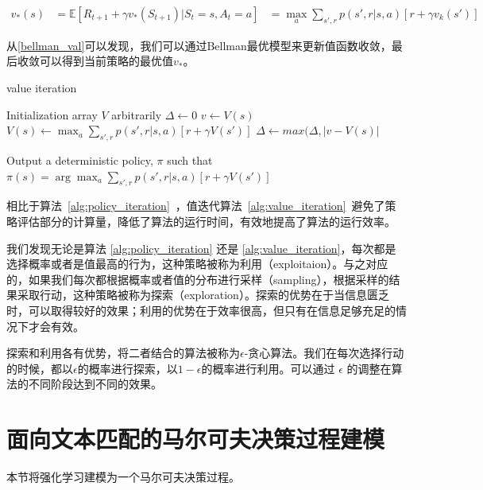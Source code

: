 \begin{equation}\label{bellman_val}
	\begin{aligned}
		v_*(s) &= \mathbb{E}[R_{t+1}+\gamma v_*(S_{t+1})|S_t=s,A_t=a]
			   &= \max_a \sum_{s',r}p(s', r|s, a)[r+\gamma v_k(s')]
	\end{aligned}
\end{equation}

从\eqref{bellman_val}可以发现，我们可以通过Bellman最优模型来更新值函数收敛，最后收敛可以得到当前策略的最优值$v_*$。

\begin{algorithm}[!htbp]
    \small
    \caption{value iteration}\label{alg:value_iteration}
    \begin{algorithmic}
        \STATE Initialization array $V$ arbitrarily
        \REPEAT
        \STATE $\Delta \leftarrow 0$
        \STATE $v \leftarrow V(s)$
        \STATE $V(s)\leftarrow \max_a\sum_{s', r} p(s', r|s, a)[r + \gamma V(s')]$
        \STATE $\Delta \leftarrow max(\Delta, |v-V(s)|$
        \ENDFOR
        \UNTIL {$\Delta < \theta$}

        \STATE Output a deterministic policy, $\pi$ such that
        \STATE $\pi(s) = \arg\max_a\sum_{s', r} p(s', r|s, a)[r + \gamma V(s')]$
    \end{algorithmic}
\end{algorithm}



相比于算法~\ref{alg:policy_iteration}~，值迭代算法~\ref{alg:value_iteration}~避免了策略评估部分的计算量，降低了算法的运行时间，有效地提高了算法的运行效率。

我们发现无论是算法 \ref{alg:policy_iteration} 还是 \ref{alg:value_iteration}，每次都是选择概率或者是值最高的行为，这种策略被称为利用（exploitaion）。与之对应的，如果我们每次都根据概率或者值的分布进行采样（sampling），根据采样的结果采取行动，这种策略被称为探索（exploration）。探索的优势在于当信息匮乏时，可以取得较好的效果；利用的优势在于效率很高，但只有在信息足够充足的情况下才会有效。

探索和利用各有优势，将二者结合的算法被称为$\epsilon$-贪心算法。我们在每次选择行动的时候，都以$\epsilon$的概率进行探索，以$1-\epsilon$的概率进行利用。可以通过 $\epsilon$ 的调整在算法的不同阶段达到不同的效果。


\section{面向文本匹配的马尔可夫决策过程建模}
\label{sec:TM_MDP}
本节将强化学习建模为一个马尔可夫决策过程。

